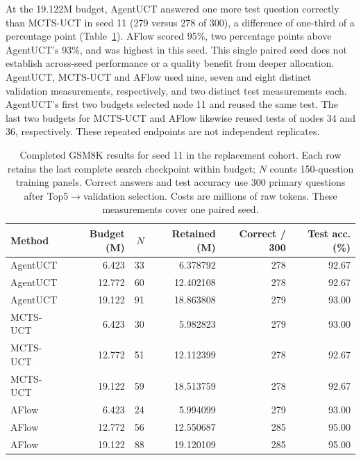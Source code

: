 At the 19.122M budget, AgentUCT answered one more test question correctly
than MCTS-UCT in seed 11 (279 versus 278 of 300), a difference of one-third
of a percentage point (Table~\ref{tab:gsm-counted-seed11}). AFlow scored
95\%, two percentage points above AgentUCT's 93\%, and was highest in this
seed. This single paired seed does not establish across-seed performance
or a quality benefit from deeper allocation.
AgentUCT, MCTS-UCT and AFlow used nine, seven and eight distinct validation
measurements, respectively, and two distinct test measurements each.
AgentUCT's first two budgets selected node 11 and reused the same test.
The last two budgets for MCTS-UCT and AFlow likewise reused tests of
nodes 34 and 36, respectively. These repeated endpoints are not independent
replicates.

\begin{table}[t]
\centering\small
\caption{Completed GSM8K results for seed 11 in the replacement cohort.
Each row retains the last complete search checkpoint within budget; $N$
counts 150-question training panels. Correct answers and test accuracy use
300 primary questions after Top5$\to$validation selection. Costs are millions
of raw tokens. These measurements cover one paired seed.}
\label{tab:gsm-counted-seed11}
\setlength{\tabcolsep}{4pt}
\begin{tabular}{@{}lrrrrr@{}}
\toprule
Method & Budget (M) & $N$ & Retained (M) & Correct / 300 & Test acc. (\%)\\
\midrule
AgentUCT & 6.423 & 33 & 6.378792 & 278 & 92.67\\
AgentUCT & 12.772 & 60 & 12.402108 & 278 & 92.67\\
AgentUCT & 19.122 & 91 & 18.863808 & 279 & 93.00\\
\midrule
MCTS-UCT & 6.423 & 30 & 5.982823 & 279 & 93.00\\
MCTS-UCT & 12.772 & 51 & 12.112399 & 278 & 92.67\\
MCTS-UCT & 19.122 & 59 & 18.513759 & 278 & 92.67\\
\midrule
AFlow & 6.423 & 24 & 5.994099 & 279 & 93.00\\
AFlow & 12.772 & 56 & 12.550687 & 285 & 95.00\\
AFlow & 19.122 & 88 & 19.120109 & 285 & 95.00\\
\bottomrule
\end{tabular}
\end{table}


